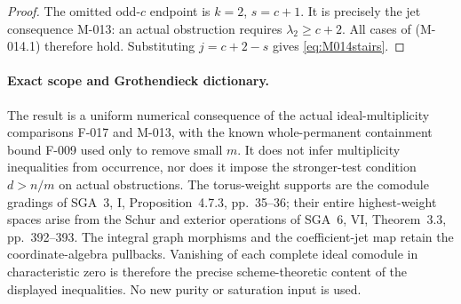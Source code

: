 \begin{proof}
The omitted odd-\(c\) endpoint is \(k=2\), \(s=c+1\).
It is precisely the jet consequence M-013:
an actual obstruction requires \(\lambda_2\geq c+2\).
All cases of (M-014.1) therefore hold. Substituting
\(j=c+2-s\) gives \eqref{eq:M014stairs}.
\end{proof}

\paragraph{Exact scope and Grothendieck dictionary.}
The result is a uniform numerical consequence of the actual
ideal-multiplicity comparisons F-017 and M-013, with the
known whole-permanent containment bound F-009 used only
to remove small \(m\). It does not infer multiplicity
inequalities from occurrence, nor does it impose the stronger-test
condition \(d>n/m\) on actual obstructions.
The torus-weight supports are the comodule gradings of
SGA~3, I, Proposition~4.7.3, pp.~35--36; their entire
highest-weight spaces arise from the Schur and exterior
operations of SGA~6, VI, Theorem~3.3, pp.~392--393.
The integral graph morphisms and the coefficient-jet map
retain the coordinate-algebra pullbacks. Vanishing of each
complete ideal comodule in characteristic zero is therefore
the precise scheme-theoretic content of the displayed
inequalities. No new purity or saturation input is used.
